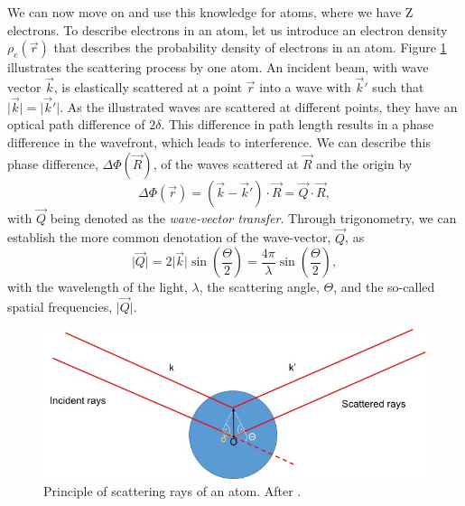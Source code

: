 We can now move on and use this knowledge for atoms, where we have Z electrons. To describe electrons in an atom, let us introduce an electron density $\rho_{e}\left(\vec{r}\right)$ that describes the probability density of electrons in an atom. Figure \ref{fig:X-ray-scattering} illustrates the scattering process by one atom. An incident beam, with wave vector $\vec{k}$, is elastically scattered at a point $\vec{r}$ into a wave with $\vec{k}'$ such that $\lvert \vec{k}\rvert=\lvert \vec{k}'\rvert$. As the illustrated waves are scattered at different points, they have an optical path difference of $2 \delta$. This difference in path length results in a phase difference in the wavefront, which leads to interference. We can describe this phase difference, $\Delta \Phi\left(\vec{R}\right)$, of the waves scattered at $\vec{R}$ and the origin by
\begin{equation}
\Delta \Phi\left(\vec{r}\right) = \left(\vec{k}-\vec{k}'\right)\cdot \vec{R} = \vec{Q} \cdot \vec{R},
\label{eq:phase-difference}
\end{equation}
with $\vec{Q}$ being denoted as the \textit{wave-vector transfer}. Through trigonometry, we can establish the more common denotation of the wave-vector, $\vec{Q}$, as
\begin{equation}
\lvert \vec{Q}\rvert=2 \lvert \vec{k}\rvert \sin\left(\frac{\Theta}{2}\right)=\frac{4 \pi}{\lambda}\sin\left(\frac{\Theta}{2}\right),
\label{eq:Q-scattering-angle}
\end{equation}
with the wavelength of the light, $\lambda$, the scattering angle, $\Theta$, and the so-called spatial frequencies, $\lvert \vec{Q}\rvert$.\\[1\baselineskip]
\begin{figure}
	\centering
		\includegraphics[width=1.00\textwidth]{images/X-ray-scattering.jpg}
	\caption[Principle of scattering rays of an atom.]{Principle of scattering rays of an atom. After \citep{Als-Nielson-2011-JWS,Guinier-1955-JWS}.}
	\label{fig:X-ray-scattering}
\end{figure}

